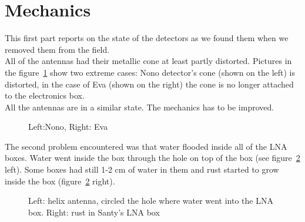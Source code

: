 \section{Mechanics}
This first part reports on the state of the detectors as we found them
when we removed  them from the field.\\ All of  the antennas had their
metallic   cone  at   least   partly  distorted.    Pictures  in   the
figure~\ref{fig:cone}  show two  extreme cases:  Nono  detector's cone
(shown on  the left) is  distorted, in the  case of Eva (shown  on the
right) the  cone is no longer  attached to the  electronics box.\\ All
the antennas are in a similar state. The mechanics has to be improved.
\begin{figure}[!ht]
  \centering
  \hspace*{-3ex}
  \caption{Left:Nono, Right: Eva}
  \label{fig:cone}
\end{figure}

The second  problem encountered was  that water flooded inside  all of
the LNA boxes.   Water went inside the box through the  hole on top of
the box (see figure~\ref{fig:lnabox}  left).  Some boxes had still 1-2
cm  of  water  in  them  and  rust started  to  grow  inside  the  box
(figure~\ref{fig:lnabox} right).

\begin{figure}[!ht]
  \centering
  \hspace*{-3ex}
  \caption{Left: helix antenna, circled the hole where water went into
    the LNA box. Right: rust in Santy's LNA box}
  \label{fig:lnabox}
\end{figure}



